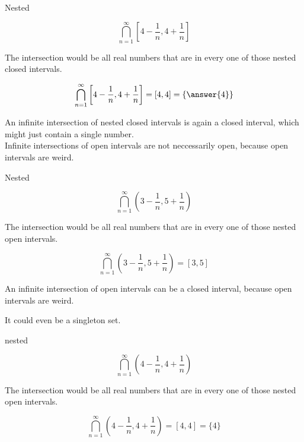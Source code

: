 \documentclass{ximera}
\begin{document}
\begin{example} Nested


\[ \bigcap_{n=1}^{\infty}   \left[4 - \frac{1}{n}, 4 +  \frac{1}{n}\right]     \]



The intersection would be all real numbers that are in every one of those nested closed intervals.


\[ \bigcap_{n=1}^{\infty}   \left[4 -  \frac{1}{n}, 4 + \frac{1}{n}\right]    = [4, 4] = \left\{ \answer{4} \right\}  \]





\end{example}


An infinite intersection of nested closed intervals is again a closed interval, which might just contain a single number. \\





Infinite intersections of open intervals are not neccessarily open, because open intervals are weird.


\begin{example} Nested


\[ \bigcap_{n=1}^{\infty}   \left(3 - \frac{1}{n}, 5 + \frac{1}{n}\right)     \]



The intersection would be all real numbers that are in every one of those nested open intervals.


\[ \bigcap_{n=1}^{\infty}   \left(3 - \frac{1}{n}, 5 + \frac{1}{n}\right)  = [3, 5]   \]





\end{example}


An infinite intersection of open intervals can be a closed interval, because open intervals are weird.


It could even be a singleton set.




\begin{example} nested


\[ \bigcap_{n=1}^{\infty}   \left(4 - \frac{1}{n}, 4 +  \frac{1}{n}\right)     \]



The intersection would be all real numbers that are in every one of those nested open intervals.


\[ \bigcap_{n=1}^{\infty}   \left(4 -  \frac{1}{n}, 4 + \frac{1}{n}\right)    = [4, 4] = \{ 4 \}   \]





\end{example}
\end{document}
